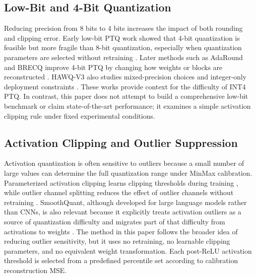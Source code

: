 \subsection{Low-Bit and 4-Bit Quantization}
Reducing precision from 8 bits to 4 bits increases the impact of both rounding and clipping error. Early low-bit PTQ work showed that 4-bit quantization is feasible but more fragile than 8-bit quantization, especially when quantization parameters are selected without retraining \cite{banner2018post,choukroun2019low}. Later methods such as AdaRound and BRECQ improve 4-bit PTQ by changing how weights or blocks are reconstructed \cite{nagel2020adaround,li2021brecq}. HAWQ-V3 also studies mixed-precision choices and integer-only deployment constraints \cite{yao2020hawqv3}. These works provide context for the difficulty of INT4 PTQ. In contrast, this paper does not attempt to build a comprehensive low-bit benchmark or claim state-of-the-art performance; it examines a simple activation clipping rule under fixed experimental conditions.

\subsection{Activation Clipping and Outlier Suppression}
Activation quantization is often sensitive to outliers because a small number of large values can determine the full quantization range under MinMax calibration. Parameterized activation clipping learns clipping thresholds during training \cite{choi2018pact}, while outlier channel splitting reduces the effect of outlier channels without retraining \cite{zhao2019outlier}. SmoothQuant, although developed for large language models rather than CNNs, is also relevant because it explicitly treats activation outliers as a source of quantization difficulty and migrates part of that difficulty from activations to weights \cite{xiao2022smoothquant}. The method in this paper follows the broader idea of reducing outlier sensitivity, but it uses no retraining, no learnable clipping parameters, and no equivalent weight transformation. Each post-ReLU activation threshold is selected from a predefined percentile set according to calibration reconstruction MSE.
